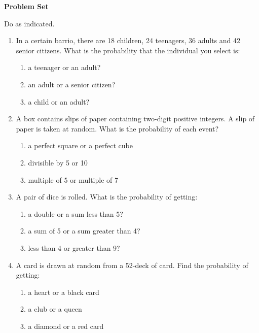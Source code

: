 \textbf{Problem Set}

\vspce

Do as indicated. 
\begin{enumerate}[label = \arabic*. ]
\item In a certain barrio, there are 18 children, 24 teenagers, 36 adults and 42 senior citizens. What is the probability that the
individual you select is:
\begin{enumerate}[label = \alph*. ]
\item a teenager or an adult? 
\item an adult or a senior citizen?
\item a child or an adult? 
\end{enumerate} 

\item A box contains slips of paper containing two-digit positive integers. A slip of paper is taken at random. What
is the probability of each event?
\begin{enumerate}[label = \alph*. ]
\item a perfect square or a perfect cube 
\item divisible by 5 or 10
\item multiple of 5 or multiple of 7
\end{enumerate} 

\item A pair of dice is rolled. What is the probability of getting: 
\begin{enumerate}[label = \alph*. ]
\item a double or a sum less than 5? 
\item a sum of 5 or a sum greater than 4? 
\item less than 4 or greater than 9? 
\end{enumerate} 

\item A card is drawn at random from a 52-deck of card. Find the probability of getting: 
\begin{enumerate}[label = \alph*. ]
\item a heart or a black card
\item a club or a queen
\item a diamond or a red card
\end{enumerate} 

\end{enumerate}  

